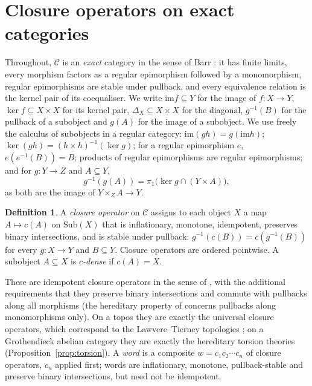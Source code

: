 \documentclass[11pt]{amsart}
\theoremstyle{definition}
\newtheorem{defi}[thm]{Definition}
\newcommand{\im}{\mathrm{im}}
\newcommand{\Sub}{\mathrm{Sub}}
\newcommand{\cC}{\mathcal C}
\begin{document}
\section{Closure operators on exact categories}\label{sec:prelim}

Throughout, $\cC$ is an \emph{exact} category in the sense of Barr
\cite{Barr}: it has finite limits, every morphism factors as a regular
epimorphism followed by a monomorphism, regular epimorphisms are stable under
pullback, and every equivalence relation is the kernel pair of its
coequaliser. We write $\im f\subseteq Y$ for the image of $f\colon X\to Y$,
$\ker f\subseteq X\times X$ for its kernel pair, $\Delta_X\subseteq X\times X$
for the diagonal, $g^{-1}(B)$ for the pullback of a subobject and $g(A)$ for
the image of a subobject. We use freely the calculus of subobjects in a
regular category: $\im(gh)=g(\im h)$; $\ker(gh)=(h\times h)^{-1}(\ker g)$;
for a regular epimorphism $e$, $e(e^{-1}(B))=B$; products of regular
epimorphisms are regular epimorphisms; and for $g\colon Y\to Z$ and
$A\subseteq Y$,
\[
g^{-1}(g(A))=\pi_1\bigl(\ker g\cap(Y\times A)\bigr),
\]
as both are the image of $Y\times_ZA\to Y$.

\begin{defi}
A \emph{closure operator} on $\cC$ assigns to each object $X$ a map
$A\mapsto c(A)$ on $\Sub(X)$ that is inflationary, monotone, idempotent,
preserves binary intersections, and is stable under pullback:
$g^{-1}(c(B))=c(g^{-1}(B))$ for every $g\colon X\to Y$ and $B\subseteq Y$.
Closure operators are ordered pointwise. A subobject $A\subseteq X$ is
\emph{$c$-dense} if $c(A)=X$.
\end{defi}

These are idempotent closure operators in the sense of \cite{DT}, with
the additional requirements that they preserve binary intersections and
commute with pullbacks along all morphisms (the hereditary property of
\cite{DT} concerns pullbacks along monomorphisms only). On a topos they are
exactly the universal closure operators, which correspond to the
Lawvere--Tierney topologies \cite[V.1]{MLM}; on a Grothendieck abelian
category they are exactly the hereditary torsion theories
(Proposition~\ref{prop:torsion}). A \emph{word} is a composite
$w=c_1c_2\cdots c_n$ of closure operators, $c_n$ applied first; words are
inflationary, monotone, pullback-stable and preserve binary intersections,
but need not be idempotent.
\end{document}
